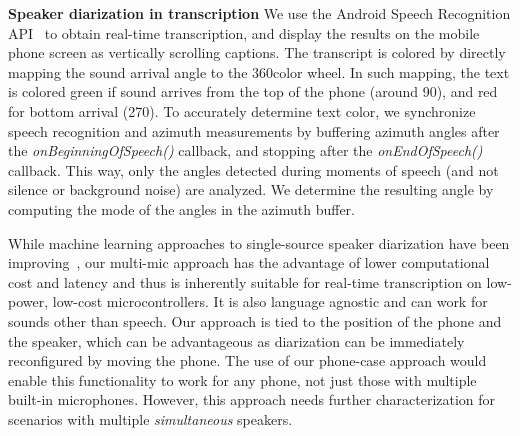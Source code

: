 \textbf{Speaker diarization in transcription}
We use the Android Speech Recognition API~\cite{AndroidSpeechRecognizer} to obtain real-time transcription, and display the results on the mobile phone screen as vertically scrolling captions. The transcript is colored by directly mapping the sound arrival angle to the 360\textdegree color wheel. In such mapping, the text is colored green if sound arrives from the top of the phone (around 90\textdegree), and red for bottom arrival (270\textdegree). To accurately determine text color, we synchronize speech recognition and azimuth measurements by buffering azimuth angles after the \textit{onBeginningOfSpeech()} callback, and stopping after the \textit{onEndOfSpeech()} callback. This way, only the angles detected during moments of speech (and not silence or background noise) are analyzed. %
We determine the resulting angle by computing the mode of the angles in the azimuth buffer.

While machine learning approaches to single-source speaker diarization have been improving~\cite{park2022review}, our multi-mic approach has the advantage of lower computational cost and latency and thus is inherently suitable for real-time transcription on low-power, low-cost microcontrollers. It is also language agnostic and can work for sounds other than speech. Our approach is tied to the position of the phone and the speaker, which can be advantageous as diarization can be immediately reconfigured by moving the phone. The use of our phone-case approach would enable this functionality to work for any phone, not just those with multiple built-in microphones. However, this approach needs further characterization for scenarios with multiple \textit{simultaneous} speakers.



